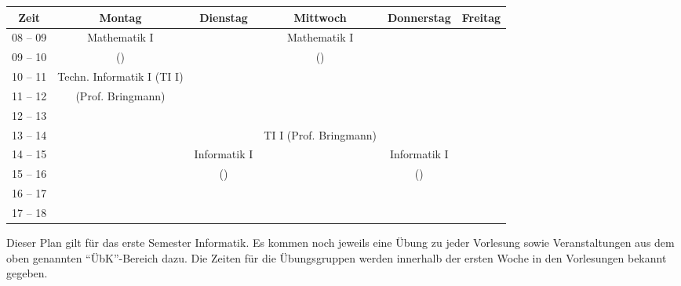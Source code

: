 \begin{minipage}{\textwidth}
    \footnotesize
\begin{center}
	\begin{tabular}{|c|c|c|c|c|c|}
	\hline
	 Zeit     &    Montag                    & Dienstag          & Mittwoch          	& Donnerstag 			& Freitag		\\ \hline\hline
	 08 -- 09 &    Mathematik I              &                   & Mathematik I      	&  				&			\\ \cline{1-1} \cline{3-3} \cline{5-6} 
	 09 -- 10 &    (\Matheprof)              &                   & (\Matheprof) 		&  				&			\\ \hline
	 10 -- 11 &    Techn. Informatik I (TI I)&                   &                   	&  				&			\\ \cline{1-1} \cline{3-6}
	 11 -- 12 &    (Prof. Bringmann)		 &                   &                   	&  				&			\\ \hline
	 12 -- 13 &                              &                   &  			&  				&			\\ \cline{1-3} \cline{3-6}
	 13 -- 14 &                              &                   & TI I (Prof. Bringmann)& 				&			\\ \hline
	 14 -- 15 &                              & Informatik I      &                 		&  Informatik I 		&			\\ \cline{1-2} \cline{4-4} \cline{6-6}
	 15 -- 16 &                              & (\Infoprof)       &	                   	&  (\Infoprof) 			&			\\ \hline
	 16 -- 17 &                              &                   &                   	&  				&			\\ \hline
	 17 -- 18 &                              &                   &                   	&  				&			\\ \hline
	\end{tabular}

\end{center}
\end{minipage}

Dieser Plan gilt für das erste Semester Informatik. Es kommen noch jeweils eine Übung zu jeder Vorlesung
sowie Veranstaltungen aus dem oben genannten "`ÜbK"'-Bereich dazu.
Die Zeiten für die Übungsgruppen werden innerhalb der ersten Woche in den Vorlesungen bekannt gegeben. \\ \\ \noindent
